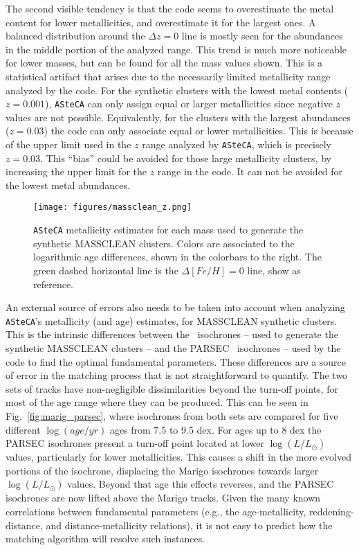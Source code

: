 \documentclass[draft]{aa}
\begin{document}
\begin{appendix}
The second visible tendency is that the code seems to overestimate the metal
content for lower metallicities, and overestimate it for the largest ones.
A balanced distribution around the $\Delta z{=}0$ line is mostly seen for the
abundances in the middle portion of the analyzed range. This trend is much more
noticeable for lower masses, but can be found for all the mass values shown.
%
This is a statistical artifact that arises due to the necessarily limited
metallicity range analyzed by the code. For the synthetic clusters with the
lowest metal contents ($z{=}0.001$), \texttt{ASteCA} can only assign equal or
larger metallicities since negative $z$ values are not possible.
Equivalently, for the clusters with the largest abundances ($z{=}0.03$) the code
can only associate equal or lower metallicities. This is because of the upper
limit used in the $z$ range analyzed by \texttt{ASteCA}, which is precisely
$z{=}0.03$.
This ``bias'' could be avoided for those large metallicity clusters, by
increasing the upper limit for the $z$ range in the code. It can not be avoided
for the lowest metal abundances.\\

\begin{figure*}
\texttt{[image: figures/massclean\_z.png]}
\caption{\texttt{ASteCA} metallicity estimates for each mass used to generate
the synthetic MASSCLEAN clusters. Colors are associated to the logarithmic age
differences, shown in the colorbars to the right. The green dashed horizontal
line is the $\Delta[Fe/H]{=}0$ line, show as reference.}
\label{fig:massclean_z}
\end{figure*}

An external source of errors also needs to be taken into account when analyzing
\texttt{ASteCA}'s metallicity (and age) estimates, for MASSCLEAN synthetic
clusters.
%
This is the intrinsic differences between the~\cite{Marigo_2008} isochrones --
used to generate the synthetic MASSCLEAN clusters -- and the
PARSEC~\citep{Bressan_2012} isochrones -- used by the code to find the optimal
fundamental parameters. These differences are a source of error in the matching
process that is not straightforward to quantify.
%
The two sets of tracks have non-negligible dissimilarities beyond the turn-off
points, for most of the age range where they can be produced. This can be seen
in Fig.~\ref{fig:marig_parsec}, where isochrones from both sets are compared for
five different $\log(age/yr)$ ages from 7.5 to 9.5 dex.
%
For ages up to 8 dex the PARSEC isochrones present a turn-off point located at
lower $\log(L/L_{\odot})$ values, particularly for lower metallicities. This
causes a shift in the more evolved portions of the isochrone, displacing the
Marigo isochrones towards larger $\log(L/L_{\odot})$ values.
%
Beyond that age this effects reverses, and the PARSEC isochrones are now lifted
above the Marigo tracks. Given the many known correlations between fundamental
parameters (e.g., the age-metallicity, reddening-distance, and
distance-metallicity relations), it is not easy to predict how the matching
algorithm will resolve such instances.


\end{appendix}
\end{document}
